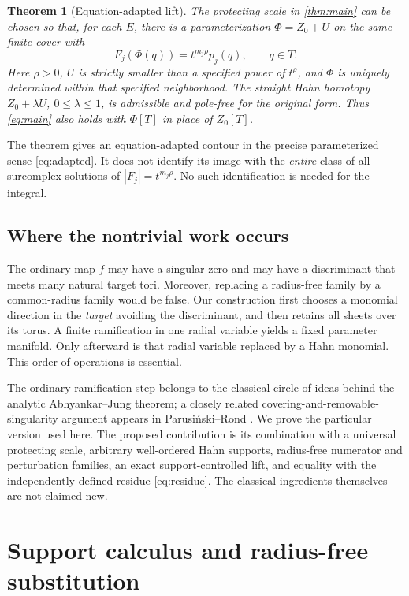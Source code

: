 \documentclass[11pt,letterpaper]{article}
\newtheorem{theorem}{Theorem}[section]
\theoremstyle{definition}
\theoremstyle{remark}
\numberwithin{equation}{section}
\begin{document}
\begin{theorem}[Equation-adapted lift]\label{thm:adapted-main}
The protecting scale in \cref{thm:main} can be chosen so that, for each $E$,
there is a parameterization $\Phi=Z_0+U$ on the same finite cover with
\begin{equation}\label{eq:adapted}
 F_j(\Phi(q))=t^{m_j\rho}p_j(q),\qquad q\in T.
\end{equation}
Here $\rho>0$, $U$ is strictly smaller than a specified power of $t^\rho$,
and $\Phi$ is uniquely determined within that specified neighborhood.
The straight Hahn homotopy $Z_0+\lambda U$, $0\leq\lambda\leq1$, is
admissible and pole-free for the original form. Thus \eqref{eq:main} also
holds with $\Phi[T]$ in place of $Z_0[T]$.
\end{theorem}

The theorem gives an equation-adapted contour in the precise parameterized
sense \eqref{eq:adapted}. It does not identify its image with the \emph{entire}
class of all surcomplex solutions of $|F_j|=t^{m_j\rho}$.
No such identification is needed for the integral.

\subsection{Where the nontrivial work occurs}
The ordinary map $f$ may have a singular zero and may have a discriminant that
meets many natural target tori. Moreover, replacing a radius-free family by a
common-radius family would be false. Our construction first chooses a monomial
direction in the \emph{target} avoiding the discriminant, and then retains all
sheets over its torus. A finite ramification in one radial variable yields a
fixed parameter manifold. Only afterward is that radial variable replaced by a
Hahn monomial. This order of operations is essential.

The ordinary ramification step belongs to the classical circle of ideas behind
the analytic Abhyankar--Jung theorem; a closely related covering-and-removable-singularity argument appears in Parusi\'nski--Rond \cite[Proposition 2.1]{PR}.
We prove the particular version used here. The proposed contribution is its
combination with a universal protecting scale, arbitrary well-ordered Hahn
supports, radius-free numerator and perturbation families, an exact
support-controlled lift, and equality with the independently defined residue
\eqref{eq:residue}. The classical ingredients themselves are not claimed new.

\section{Support calculus and radius-free substitution}
\label{sec:support}
\end{document}
